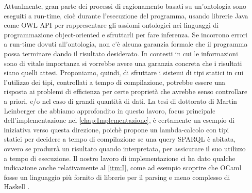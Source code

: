 Attualmente, gran parte dei processi di ragionamento basati su un'ontologia sono eseguiti a run-time, cioè durante l'esecuzione del programma, usando librerie Java come OWL API \cite{OWLAPI} per rappresentare gli assiomi ontologici nei linguaggi di programmazione object-oriented e sfruttarli per fare inferenza. Se incorrono errori a run-time dovuti all'ontologia, non c'è alcuna garanzia formale che il programma possa terminare dando il risultato desiderato. In contesti in cui le informazioni sono di vitale importanza si vorrebbe avere una garanzia concreta che i risultati siano quelli attesi. Proponiamo, quindi, di sfruttare i sistemi di tipi statici in cui l'utilizzo dei tipi, controllati a tempo di compilazione, potrebbe essere una risposta ai problemi di efficienza per certe proprietà che avrebbe senso controllare a priori, e/o nel caso di grandi quantità di dati. La tesi di dottorato di Martin Leinberger \cite{leinbergerphdthesis} che abbiamo approfondito in questo lavoro, focus principale dell'implementazione nel \autoref{chap:Implementazione}, è certamente un esempio di iniziativa verso questa direzione, poichè propone un lambda-calcolo con tipi statici per decidere a tempo di compilazione se una query SPARQL è abitata, ovvero se produrrà un risultato quando interpretata, per assicurare il suo utilizzo a tempo di esecuzione. Il nostro lavoro di implementazione ci ha dato qualche indicazione anche relativamente al \autoref{itm:I}, come ad esempio scoprire che OCaml \cite{...} fosse un linguaggio più fornito di librerie per il parsing e meno complesso di Haskell \cite{...}.


